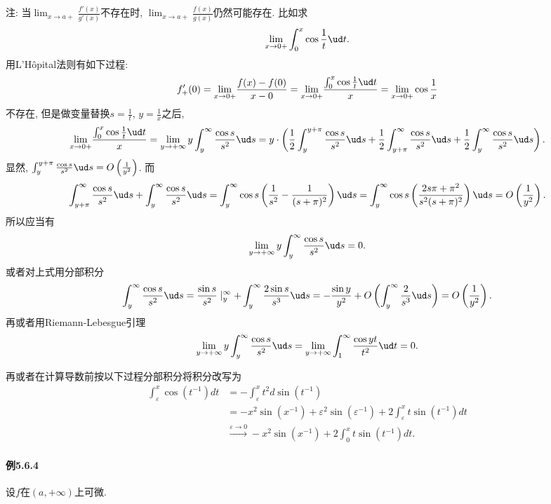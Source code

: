 注: 当$\lim_{x\to a+}\frac{f'(x)}{g'(x)}$不存在时, $\lim_{x\to a+}\frac{f(x)}{g(x)}$仍然可能存在.
比如求
\[
\lim_{x\to0+}\int_{0}^{x}\cos\frac{1}{t}\ud t.
\]
用L'H\^{o}pital法则有如下过程:
\[
f'_{+}(0)=\underset{x\to0+}{\mathop{\lim}}\frac{f(x)-f(0)}{x-0}=\underset{x\to0+}{\mathop{\lim}}\frac{\int_{0}^{x}\cos\frac{1}{t}\ud t}{x}=\underset{x\to0+}{\mathop{\lim}}\cos\frac{1}{x}
\]
不存在, 但是做变量替换$s=\frac{1}{t}$, $y=\frac{1}{x}$之后, 
\[
\underset{x\to0+}{\mathop{\lim}}\frac{\int_{0}^{x}\cos\frac{1}{t}\ud t}{x}=\lim_{y\to+\infty}y\int_{y}^{\infty}\frac{\cos s}{s^{2}}\ud s=y\cdot\left(\frac{1}{2}\int_{y}^{y+\pi}\frac{\cos s}{s^{2}}\ud s+\frac{1}{2}\int_{y+\pi}^{\infty}\frac{\cos s}{s^{2}}\ud s+\frac{1}{2}\int_{y}^{\infty}\frac{\cos s}{s^{2}}\ud s\right).
\]
显然, $\int_{y}^{y+\pi}\frac{\cos s}{s^{2}}\ud s=O\left(\frac{1}{y^{2}}\right)$.
而
\[
\int_{y+\pi}^{\infty}\frac{\cos s}{s^{2}}\ud s+\int_{y}^{\infty}\frac{\cos s}{s^{2}}\ud s=\int_{y}^{\infty}\cos s\left(\frac{1}{s^{2}}-\frac{1}{(s+\pi)^{2}}\right)\ud s=\int_{y}^{\infty}\cos s\left(\frac{2s\pi+\pi^{2}}{s^{2}(s+\pi)^{2}}\right)\ud s=O\left(\frac{1}{y^{2}}\right).
\]
所以应当有
\[
\lim_{y\to+\infty}y\int_{y}^{\infty}\frac{\cos s}{s^{2}}\ud s=0.
\]
或者对上式用分部积分
\[
\int_{y}^{\infty}\frac{\cos s}{s^{2}}\ud s=\frac{\sin s}{s^{2}}\mid_{y}^{\infty}+\int_{y}^{\infty}\frac{2\sin s}{s^{3}}\ud s=-\frac{\sin y}{y^{2}}+O\left(\int_{y}^{\infty}\frac{2}{s^{3}}\ud s\right)=O\left(\frac{1}{y^{2}}\right).
\]
再或者用Riemann-Lebesgue引理
\[
\lim_{y\to+\infty}y\int_{y}^{\infty}\frac{\cos s}{s^{2}}\ud s=\lim_{y\to+\infty}\int_{1}^{\infty}\frac{\cos yt}{t^{2}}\ud t=0.
\]

再或者在计算导数前按以下过程分部积分将积分改写为
\[
\begin{aligned}\int_{\varepsilon}^{x}\cos\left(t^{-1}\right)dt & =-\int_{\varepsilon}^{x}t^{2}d\sin\left(t^{-1}\right)\\
	& =-x^{2}\sin\left(x^{-1}\right)+\varepsilon^{2}\sin\left(\varepsilon^{-1}\right)+2\int_{\varepsilon}^{x}t\sin\left(t^{-1}\right)dt\\
	& \stackrel{\varepsilon\rightarrow0}{\longrightarrow}-x^{2}\sin\left(x^{-1}\right)+2\int_{0}^{x}t\sin\left(t^{-1}\right)dt.
\end{aligned}
\]


\paragraph{例5.6.4}

设$f$在$(a,+\infty)$上可微.

